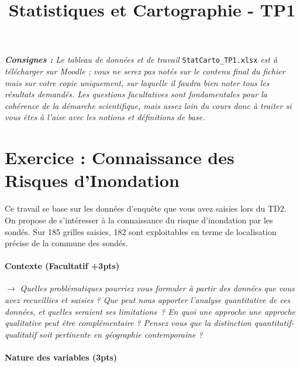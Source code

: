 





\title{\textbf{Statistiques et Cartographie - TP1}}

\date{}


\maketitle

\justify

\thispagestyle{firststyle}


\textit{\textbf{Consignes : }Le tableau de données et de travail }\texttt{StatCarto{\_}TP1.xlsx}\textit{ est à télécharger sur Moodle ; vous ne serez pas notés sur le contenu final du fichier mais sur votre copie uniquement, sur laquelle il faudra bien noter tous les résultats demandés. Les questions facultatives sont fondamentales pour la cohérence de la démarche scientifique, mais assez loin du cours donc à traiter si vous êtes à l'aise avec les notions et définitions de base.}


\bigskip


\section*{Exercice : Connaissance des Risques d'Inondation}

Ce travail se base sur les données d'enquête que vous avez saisies lors du TD2. On propose de s'intéresser à la connaissance du risque d'inondation par les sondés. Sur 185 grilles saisies, 182 sont exploitables en terme de localisation précise de la commune des sondés.


\paragraph{Contexte (Facultatif +3pts)}


$\rightarrow$ \textit{Quelles problématiques pourriez vous formuler à partir des données que vous avez recueillies et saisies ? Que peut nous apporter l’analyse quantitative de ces données, et quelles seraient ses limitations ? En quoi une approche une approche qualitative peut être complémentaire ? Pensez vous que la distinction quantitatif-qualitatif soit pertinente en géographie contemporaine ?}


\paragraph{Nature des variables (3pts)}

